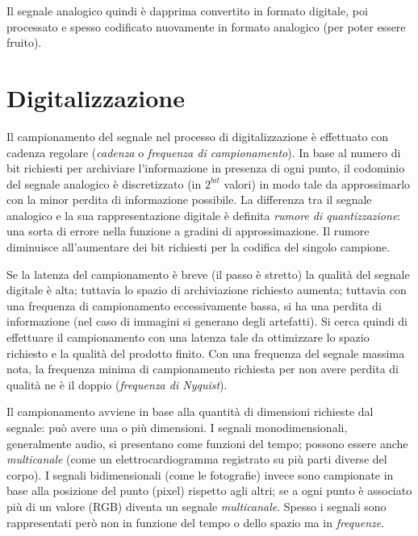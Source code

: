 \documentclass[11pt, a4page]{article}
\begin{document}
Il segnale analogico quindi è dapprima convertito in formato digitale, poi processato e spesso codificato nuovamente in formato analogico (per poter essere fruito).

\section{Digitalizzazione}
Il campionamento del segnale nel processo di digitalizzazione è effettuato con cadenza regolare (\textit{cadenza} o \textit{frequenza di campionamento}).
In base al numero di bit richiesti per archiviare l'informazione in presenza di ogni punto, il codominio del segnale analogico è discretizzato (in $2^{bit}$ valori) in modo tale da approssimarlo con la minor perdita di informazione possibile.
La differenza tra il segnale analogico e la sua rappresentazione digitale è definita \textit{rumore di quantizzazione}: una sorta di errore nella funzione a gradini di approssimazione.
Il rumore diminuisce all'aumentare dei bit richiesti per la codifica del singolo campione. \newline

Se la latenza del campionamento è breve (il passo è stretto) la qualità del segnale digitale è alta; tuttavia lo spazio di archiviazione richiesto aumenta; tuttavia con una frequenza di campionamento eccessivamente bassa, si ha una perdita di informazione (nel caso di immagini si generano degli artefatti).
Si cerca quindi di effettuare il campionamento con una latenza tale da ottimizzare lo spazio richiesto e la qualità del prodotto finito.
Con una frequenza del segnale massima nota, la frequenza minima di campionamento richiesta per non avere perdita di qualità ne è il doppio (\textit{frequenza di Nyquist}).

Il campionamento avviene in base alla quantità di dimensioni richieste dal segnale: può avere una o più dimensioni.
I segnali monodimensionali, generalmente audio, si presentano come funzioni del tempo; possono essere anche \textit{multicanale} (come un elettrocardiogramma registrato su più parti diverse del corpo).
I segnali bidimensionali (come le fotografie) invece sono campionate in base alla posizione del punto (pixel) rispetto agli altri; se a ogni punto è associato più di un valore (RGB) diventa un segnale \textit{multicanale}.
Spesso i segnali sono rappresentati però non in funzione del tempo o dello spazio ma in \textit{frequenze}.
\end{document}
